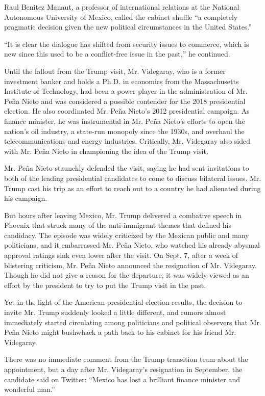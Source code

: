 Raul Benitez Manaut, a professor of international relations at the
National Autonomous University of Mexico, called the cabinet shuffle ``a
completely pragmatic decision given the new political circumstances in
the United States.''

``It is clear the dialogue has shifted from security issues to commerce,
which is new since this used to be a conflict-free issue in the past,''
he continued.

Until the fallout from the Trump visit, Mr. Videgaray, who is a former
investment banker and holds a Ph.D. in economics from the Massachusetts
Institute of Technology, had been a power player in the administration
of Mr. Peña Nieto and was considered a possible contender for the 2018
presidential election. He also coordinated Mr. Peña Nieto's 2012
presidential campaign. As finance minister, he was instrumental in Mr.
Peña Nieto's efforts to open the nation's oil industry, a state-run
monopoly since the 1930s, and overhaul the telecommunications and energy
industries. Critically, Mr. Videgaray also sided with Mr. Peña Nieto in
championing the idea of the Trump visit.

Mr. Peña Nieto staunchly defended the visit, saying he had sent
invitations to both of the leading presidential candidates to come to
discuss bilateral issues. Mr. Trump cast his trip as an effort to reach
out to a country he had alienated during his campaign.

But hours after leaving Mexico, Mr. Trump delivered a combative speech
in Phoenix that struck many of the anti-immigrant themes that defined
his candidacy. The episode was widely criticized by the Mexican public
and many politicians, and it embarrassed Mr. Peña Nieto, who watched his
already abysmal approval ratings sink even lower after the visit. On
Sept. 7, after a week of blistering criticism, Mr. Peña Nieto announced
the resignation of Mr. Videgaray. Though he did not give a reason for
the departure, it was widely viewed as an effort by the president to try
to put the Trump visit in the past.

Yet in the light of the American presidential election results, the
decision to invite Mr. Trump suddenly looked a little different, and
rumors almost immediately started circulating among politicians and
political observers that Mr. Peña Nieto might bushwhack a path back to
his cabinet for his friend Mr. Videgaray.

There was no immediate comment from the Trump transition team about the
appointment, but a day after Mr. Videgaray's resignation in September,
the candidate said on Twitter: ``Mexico has lost a brilliant finance
minister and wonderful man.''

